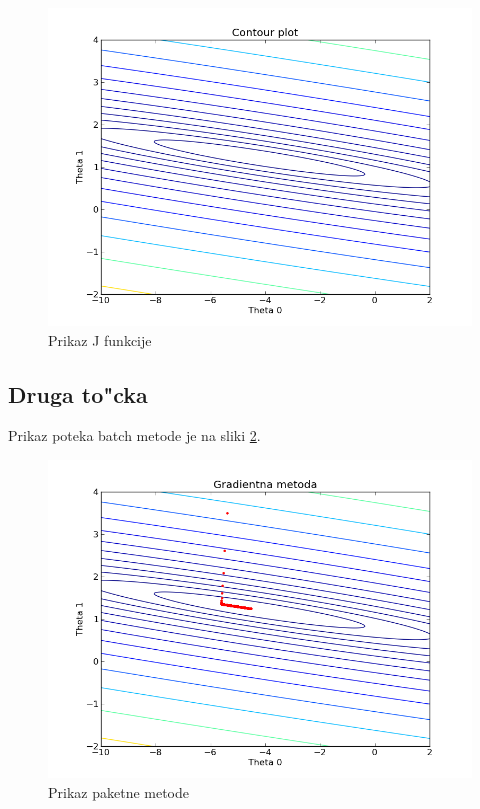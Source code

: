\documentclass[a4paper,11pt]{article}
\begin{document}
\begin{figure}[H]
\begin{center}
\includegraphics[scale=0.3]{contour.png}
\caption{Prikaz J funkcije}
\end{center}
\label{contour}
\end{figure}


\subsection{Druga to"cka}
Prikaz poteka batch metode je na sliki \ref{batch}.
\begin{figure}[H]
\begin{center}
\includegraphics[scale=0.3]{batch.png}
\caption{Prikaz paketne metode}
\end{center}
\label{batch}
\end{figure}
\end{document}

